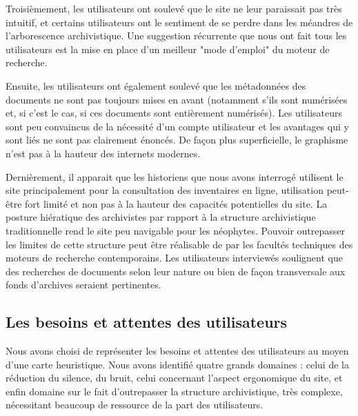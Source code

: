 \documentclass[a4paper,12pt]{article}
\begin{document}
Troisièmement, les utilisateurs ont soulevé que le site ne leur paraissait pas très intuitif, et certains utilisateurs ont le sentiment de se perdre dans les méandres de l'arborescence archivistique. Une suggestion récurrente que nous ont fait tous les utilisateurs est la mise en place d'un meilleur "mode d'emploi" du moteur de recherche.

Ensuite, les utilisateurs ont également soulevé que les métadonnées des documents ne sont pas toujours mises en avant (notamment s’ils sont numérisées et, si c’est le cas, si ces documents sont entièrement numérisés). 
Les utilisateurs sont peu convaincus de la nécessité d’un compte utilisateur et les avantages qui y sont liés ne sont pas clairement énoncés. 
De façon plus superficielle, le graphisme n’est pas à la hauteur des internets modernes. 

Dernièrement, il apparait que les historiens que nous avons interrogé utilisent le site principalement pour la consultation des inventaires en ligne, utilisation peut-être fort limité et non pas à la hauteur des capacités potentielles du site.
La posture hiératique des archivistes par rapport à la structure archivistique traditionnelle rend le site peu navigable pour les néophytes. Pouvoir outrepasser les limites de cette structure peut être réalisable de par les facultés techniques des moteurs de recherche contemporains. Les utilisateurs interviewés soulignent que des recherches de documents selon leur nature ou bien de façon transversale aux fonds d’archives seraient pertinentes.

\subsection{Les besoins et attentes des utilisateurs}
Nous avons choisi de représenter les besoins et attentes des utilisateurs au moyen d'une carte heuristique. Nous avons identifié quatre grands domaines : celui de la réduction du silence, du bruit, celui concernant l'aspect ergonomique du site, et enfin domaine sur le fait d'outrepasser la structure archivistique, très complexe, nécessitant beaucoup de ressource de la part des utilisateurs. 
\end{document}
